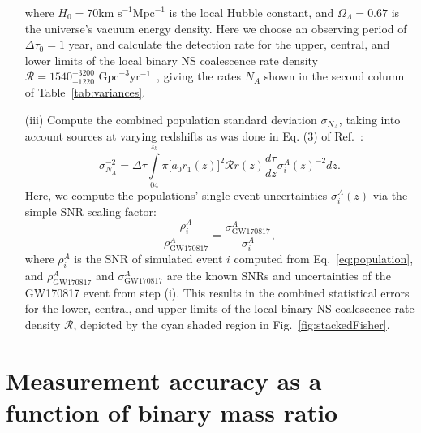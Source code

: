 \documentclass[prd,twocolumn,nofootinbib,superscriptaddress,amsmath,amssymb]{revtex4-1}
\begin{document}
\begin{enumerate}
where $H_0 = 70 \text{km s}^{-1}\text{Mpc}^{-1}$ is the local Hubble constant, and $\Omega_{\Lambda}=0.67$ is the universe's vacuum energy density.
Here we choose an observing period of $\Delta \tau_0 = 1$ year, and calculate the detection rate for the upper, central, and lower limits of the local binary NS coalescence rate density $\mathcal{R}=1540^{+3200}_{-1220} \text{ Gpc}^{-3}\text{yr}^{-1}$~\cite{Abbott2017}, giving the rates $N_A$ shown in the second column of Table~\ref{tab:variances}.

\item[(iii)] Compute the combined population standard deviation $\sigma_{N_A}$, taking into account sources at varying redshifts as was done in Eq. (3) of Ref.~\cite{Takahiro}:
\begin{equation}
\sigma_{N_A}^{-2}=\Delta \tau \int\limits^{z_h}_04 \pi \lbrack a_0 r_1(z)\rbrack^2 \mathcal{R}r(z)\frac{d\tau}{dz}\sigma^A_i(z)^{-2}dz.
\end{equation}
Here, we compute the populations' single-event uncertainties $\sigma_i^A(z)$ via the simple SNR scaling factor: 
\begin{equation}
\frac{\rho_i^A}{\rho_{\text{GW170817}}^A} = \frac{\sigma_{\text{GW170817}}^A}{\sigma_i^A},
\end{equation}
where $\rho_i^A$ is the SNR of simulated event $i$ computed from Eq.~\ref{eq:population}, and $\rho_{\text{GW170817}}^A$ and $\sigma_{\text{GW170817}}^A$ are the known SNRs and uncertainties of the GW170817 event from step (i).
This results in the combined statistical errors for the lower, central, and upper limits of the local binary NS coalescence rate density $\mathcal{R}$, depicted by the cyan shaded region in Fig.~\ref{fig:stackedFisher}.
\end{enumerate}


\section{Measurement accuracy as a function of binary mass ratio}\label{app:measurement}
\end{document}
